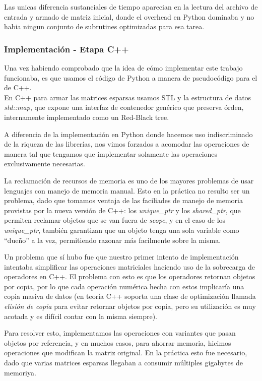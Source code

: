 Las unicas diferencia sustanciales de tiempo aparecian en la lectura del archivo de entrada
y armado de matriz inicial, donde el overhead en Python dominaba y no habia
ningun conjunto de subrutines optimizadas para esa tarea.

\subsubsection{Implementación - Etapa C++} %
\label{ssub:implementaci_n_etapa_c_}

Una vez habiendo comprobado que la idea de cómo implementar este trabajo
funcionaba, es que usamos el código de Python a manera de pseudocódigo para el de C++.\\

En C++ para armar las matrices esparsas usamos STL y la estructura de datos
\textit{std::map}, que expone una interfaz de contenedor genérico que preserva órden, internamente
implementado como un Red-Black tree.

A diferencia de la implementación en Python donde hacemos uso indiscriminado
de la riqueza de las librerías, nos vimos forzados a acomodar las operaciones
de manera tal que tengamos que implementar solamente las operaciones exclusivamente necesarias.

La reclamación de recursos de memoria es uno de los mayores problemas de usar
lenguajes con manejo de memoria manual. Esto en la práctica no resulto ser un problema,
dado que tomamos ventaja de las faciliades de manejo de memoria provistas por la nueva versión
de C++: los \textit{unique\_ptr} y los \textit{shared\_ptr}, que permiten reclamar objetos que se van fuera de
\textit{scope}, y en el caso de los \textit{unique\_ptr}, también garantizan que un objeto tenga
una sola variable como ``dueño'' a la vez, permitiendo razonar más facilmente sobre la misma.

Un problema que sí hubo fue que nuestro primer intento de implementación intentaba simplificar
las operaciones matriciales haciendo uso de la sobrecarga de operadores en C++. El problema
con esto es que los operadores retornan objetos por copia, por lo que cada operación numérica
hecha con estos implicaría una copia masiva de datos (en teoria C++ soporta una clase de optimización
llamada \textit{elisión de copia} para evitar retornar objetos por copia, pero su utilización es muy acotada y 
es difícil contar con la misma siempre).

Para resolver esto, implementamos las operaciones con variantes que pasan objetos por referencia, y 
en muchos casos, para ahorrar memoria, hicimos operaciones que modifican la matriz original. En la práctica
esto fue necesario, dado que varias matrices esparsas llegaban a consumir múltiples gigabytes de memoriya.



